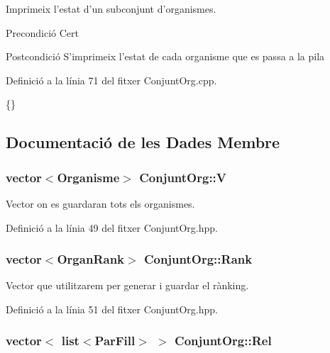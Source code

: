 Imprimeix l'estat d'un subconjunt d'organismes. 

\begin{DoxyPrecond}{Precondició}
Cert 
\end{DoxyPrecond}
\begin{DoxyPostcond}{Postcondició}
S'imprimeix l'estat de cada organisme que es passa a la pila 
\end{DoxyPostcond}


Definició a la línia 71 del fitxer Conjunt\-Org.\-cpp.


\begin{DoxyCode}
\{\}
\end{DoxyCode}


\subsection{Documentació de les Dades Membre}
\hypertarget{class_conjunt_org_adab11e0ac8295072ec682716478a535a}{
\subsubsection[{V}]{\setlength{\rightskip}{0pt plus 5cm}vector$<${\bf Organisme}$>$ Conjunt\-Org\-::\-V\hspace{0.3cm}{\ttfamily [private]}}}\label{class_conjunt_org_adab11e0ac8295072ec682716478a535a}


Vector on es guardaran tots els organismes. 



Definició a la línia 49 del fitxer Conjunt\-Org.\-hpp.

\hypertarget{class_conjunt_org_ae566806533e21f56caf27480d342c460}{
\subsubsection[{Rank}]{\setlength{\rightskip}{0pt plus 5cm}vector$<${\bf Organ\-Rank}$>$ Conjunt\-Org\-::\-Rank\hspace{0.3cm}{\ttfamily [private]}}}\label{class_conjunt_org_ae566806533e21f56caf27480d342c460}


Vector que utilitzarem per generar i guardar el rànking. 



Definició a la línia 51 del fitxer Conjunt\-Org.\-hpp.

\hypertarget{class_conjunt_org_a0c5cd7bac2272f4672a08ca5b2ea3f93}{
\subsubsection[{Rel}]{\setlength{\rightskip}{0pt plus 5cm}vector$<$ list$<${\bf Par\-Fill}$>$ $>$ Conjunt\-Org\-::\-Rel\hspace{0.3cm}{\ttfamily [private]}}}\label{class_conjunt_org_a0c5cd7bac2272f4672a08ca5b2ea3f93}


